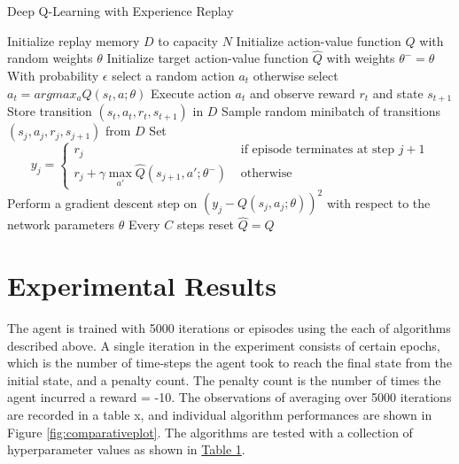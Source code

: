 \documentclass{svproc}
\begin{document}
\begin{algorithm}
\caption{Deep Q-Learning with Experience Replay}
\begin{algorithmic}
\STATE Initialize replay memory \(D\) to capacity \(N\)
\STATE Initialize action-value function \(Q\) with random weights \(\theta \)
\STATE Initialize target action-value function \(\hat{Q}\) with weights \(\theta^{-}=\theta \)
\STATE With probability \(\epsilon\) select a random action \(a_t\)
\STATE otherwise select \(a_{t}=argmax_{a}Q(s_t,a;\theta)\)
\STATE Execute action \(a_t\) and observe reward \(r_t\) and state \(s_{t+1}\)
\STATE Store transition \((s_{t}, a_{t}, r_{t}, s_{t+1})\) in \(D\)
\STATE Sample random minibatch of transitions \((s_{j},a_{j},r_{j},s_{j+1})\) from \(D\)
\STATE Set \[ y_j = \begin{cases}
r_j & \text{ if episode terminates at step } j+1 \\
r_j+\gamma \max_{a'}\hat{Q}(s_{j+1},a';\theta^{-}) & \text{ otherwise }
\end{cases} \]
\STATE Perform a gradient descent step on \((y_{j}-Q(s_{j},a_{j};\theta))^2\) with respect to the network parameters \(\theta\)
\STATE Every \(C\) steps reset \(\hat{Q}=Q\)
 \ENDFOR
\ENDFOR
\end{algorithmic}
\end{algorithm}



\newpage
\section{Experimental Results}
\label{sec:4}
The agent is trained with 5000 iterations or episodes using the each of algorithms described above. A single iteration in the experiment consists of certain epochs, which is the number of time-steps the agent took to reach the final state from the initial state, and a penalty count. The penalty count is the number of times the agent incurred a reward = -10. The observations of averaging over 5000 iterations are recorded in a table x, and individual algorithm performances are shown in Figure \ref{fig:comparativeplot}. The algorithms are tested with a collection of hyperparameter values as shown in \hyperref[tab:table]{Table 1}.
\end{document}
